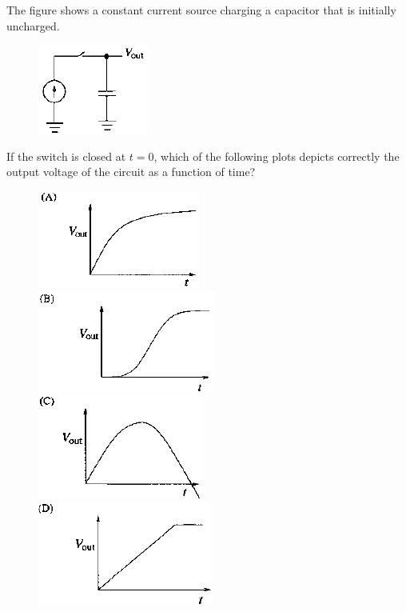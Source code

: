 \documentclass{exam}
\begin{document}
\begin{questions}
\question The figure shows a constant current source charging a capacitor that is initially uncharged.
	\begin{figure}[H] \centering
		\caption*{} \label{40} \includegraphics[width=0.3\columnwidth]{pics/40.png}
	\end{figure}
	If the switch is closed at $t=0$, which of the following plots depicts correctly the output voltage of the circuit as a function of time?\hfill{}
	\begin{figure}[H]
		\centering
		\caption*{} \label{40a} \includegraphics[width=0.45\columnwidth]{pics/40a.png}
		\caption*{} \label{40b} \includegraphics[width=0.45\columnwidth]{pics/40b.png}
		\caption*{} \label{40c} \includegraphics[width=0.45\columnwidth]{pics/40c.png}
		\caption*{} \label{40d} \includegraphics[width=0.45\columnwidth]{pics/40d.png}
	\end{figure}



\end{questions}
\end{document}
